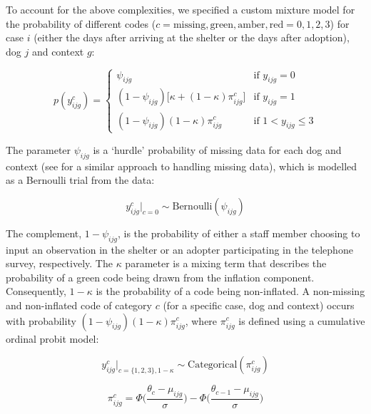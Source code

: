 \documentclass[12pt]{article}
\begin{document}
To account for the above complexities, we specified a custom mixture model for the probability of different codes ($c = {\text{missing}, \text{green}, \text{amber}, \text{red}} = {0, 1, 2, 3}$) for case $i$ (either the days after arriving at the shelter or the days after adoption), dog $j$ and context $g$:

\begin{equation}
  p(y_{ijg}^{c}) =
  \begin{cases}
      \psi_{ijg} & \text{if } y_{ijg} = 0 \\
      (1-\psi_{ijg})\big[\kappa + (1-\kappa)\pi_{ijg}^c\big]
      & \text{if } y_{ijg} = 1 \\
      (1-\psi_{ijg})(1-\kappa)\pi_{ijg}^c
      & \text{if } 1 < y_{ijg} \leq 3
  \end{cases}
  \label{eq_mixture}
\end{equation}

The parameter $\psi_{ijg}$ is a ‘hurdle’ probability of missing data for each dog and context (see \cite{kubinec2019} for a similar approach to handling missing data), which is modelled as a Bernoulli trial from the data:

\begin{equation}
  y_{ijg}^{c} \big|_{c=0} \sim \text{Bernoulli}(\psi_{ijg})
  \label{eq_missing}
\end{equation}

The complement, $1 - \psi_{ijg}$, is the probability of either a staff member choosing to input an observation in the shelter or an adopter participating in the telephone survey, respectively. The $\kappa$ parameter is a mixing term that describes the probability of a green code being drawn from the inflation component. Consequently,  $1 - \kappa$ is the probability of a code being non-inflated. A non-missing and non-inflated code of category $c$ (for a specific case, dog and context) occurs with probability $(1-\psi_{ijg})(1-\kappa)\pi_{ijg}^c$, where $\pi_{ijg}^c$ is defined using a cumulative ordinal probit model:

\begin{equation}
  y_{ijg}^{c} \big|_{c=\{1,2,3\}, 1 - \kappa} \sim \text{Categorical}(\pi_{ijg}^c)
  \label{eq_cat}
\end{equation}

\begin{equation}
  \pi_{ijg}^c = \Phi \Big( \frac{\theta_{c} - \mu_{ijg}}{\sigma} \Big) - \Phi \Big( \frac{\theta_{c-1} - \mu_{ijg}}{\sigma} \Big)
  \label{eq_ordprob}
\end{equation}
\end{document}
